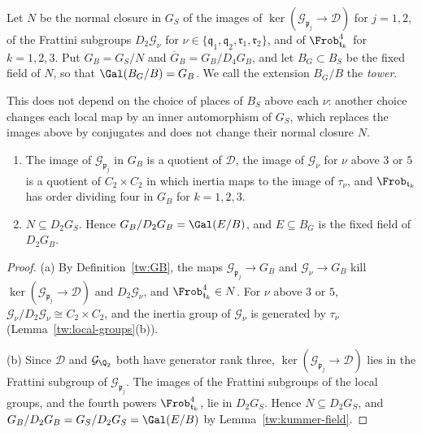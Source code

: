 \begin{definition}\label{tw:GB}
Let $N$ be the normal closure in $G_S$ of the images of
$\ker(\mathcal G_{\mathfrak p_j}\to \mathcal D)$ for $j=1,2$, of the Frattini subgroups
$D_2\mathcal G_\nu$ for $\nu\in\{\mathfrak q_1,\mathfrak q_2,\mathfrak r_1,\mathfrak r_2\}$,
and of $\Frob_{\mathfrak t_k}^4$ for $k=1,2,3$. Put $G_B=G_S/N$ and
$\overline G_B=G_B/D_4G_B$, and let $B_G\subset B_S$ be the fixed field of
$N$, so that $\Gal(B_G/B)=G_B$. We call the extension $B_G/B$ the
\emph{tower}.
\end{definition}

This does not depend on the choice of places of $B_S$ above each $\nu$:
another choice changes each local map by an inner automorphism of $G_S$,
which replaces the images above by conjugates and does not change their
normal closure $N$.

\begin{lemma}\label{tw:GB-basic}
\begin{enumerate}
\item[(a)] The image of $\mathcal G_{\mathfrak p_j}$ in $G_B$ is a quotient of
 $\mathcal D$, the image of $\mathcal G_\nu$ for $\nu$ above $3$ or $5$ is a quotient of
 $C_2\times C_2$ in which inertia maps to the image of $\tau_\nu$, and
 $\Frob_{\mathfrak t_k}$ has order dividing four in $G_B$ for $k=1,2,3$.
\item[(b)] $N\subseteq D_2G_S$. Hence $G_B/D_2G_B=\Gal(E/B)$, and $E\subseteq B_G$
 is the fixed field of $D_2G_B$.
\end{enumerate}
\end{lemma}

\begin{proof}
(a) By Definition~\ref{tw:GB}, the maps $\mathcal G_{\mathfrak p_j}\to G_B$
and $\mathcal G_\nu\to G_B$ kill $\ker(\mathcal G_{\mathfrak p_j}\to \mathcal D)$ and
$D_2\mathcal G_\nu$, and $\Frob_{\mathfrak t_k}^4\in N$. For $\nu$ above $3$
or $5$, $\mathcal G_\nu/D_2\mathcal G_\nu\cong C_2\times C_2$, and the inertia
group of $\mathcal G_\nu$ is generated by $\tau_\nu$
(Lemma~\ref{tw:local-groups}(b)).

(b) Since $\mathcal D$ and $\mathcal G_{\Q_2}$ both have generator rank three,
$\ker(\mathcal G_{\mathfrak p_j}\to \mathcal D)$ lies in the Frattini subgroup of
$\mathcal G_{\mathfrak p_j}$. The images of the Frattini subgroups of the
local groups, and the fourth powers $\Frob_{\mathfrak t_k}^4$, lie in
$D_2G_S$. Hence $N\subseteq D_2G_S$, and $G_B/D_2G_B=G_S/D_2G_S=\Gal(E/B)$ by
Lemma~\ref{tw:kummer-field}.
\end{proof}

